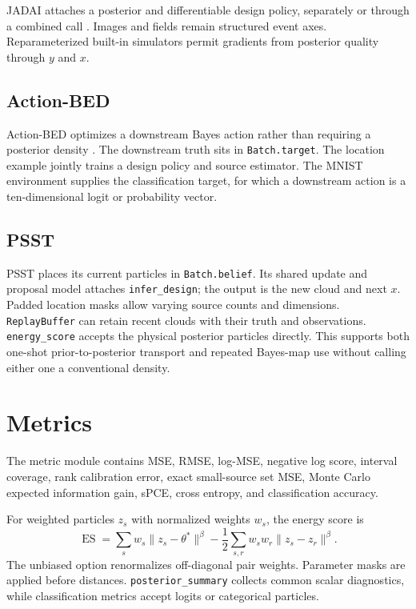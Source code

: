 \documentclass[11pt]{article}
\begin{document}
JADAI attaches a posterior and differentiable design policy, separately or through
a combined call \cite{bracher2025jadai}. Images and fields remain structured event
axes. Reparameterized built-in simulators permit gradients from posterior quality
through $y$ and $x$.

\subsection{Action-BED}

Action-BED optimizes a downstream Bayes action rather than requiring a posterior
density \cite{rossa2026actionbed}. The downstream truth sits in
\texttt{Batch.target}. The location example jointly trains a design policy and
source estimator. The MNIST environment supplies the classification target, for
which a downstream action is a ten-dimensional logit or probability vector.

\subsection{PSST}

PSST places its current particles in \texttt{Batch.belief}. Its shared update and
proposal model attaches \texttt{infer\_design}; the output is the new cloud and
next $x$. Padded location masks allow varying source counts and dimensions.
\texttt{ReplayBuffer} can retain recent clouds with their truth and observations.
\texttt{energy\_score} accepts the physical posterior particles directly. This
supports both one-shot prior-to-posterior transport and repeated Bayes-map use
without calling either one a conventional density.

\section{Metrics}

The metric module contains MSE, RMSE, log-MSE, negative log score, interval
coverage, rank calibration error, exact small-source set MSE, Monte Carlo expected
information gain, sPCE, cross entropy, and classification accuracy.

For weighted particles $z_s$ with normalized weights $w_s$, the energy score is
\begin{equation}
  \operatorname{ES}
  =\sum_s w_s\lVert z_s-\theta^*\rVert^\beta
  -\frac12\sum_{s,r}w_sw_r\lVert z_s-z_r\rVert^\beta .
\end{equation}
The unbiased option renormalizes off-diagonal pair weights. Parameter masks are
applied before distances. \texttt{posterior\_summary} collects common scalar
diagnostics, while classification metrics accept logits or categorical particles.
\end{document}

